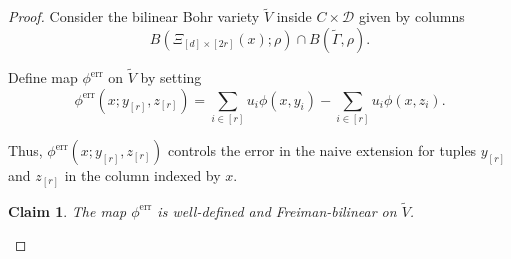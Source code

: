 \documentclass[a4paper,11pt]{article}
\numberwithin{theorem}{section}
\newtheorem{claim}[theorem]{Claim}
\theoremstyle{definition}
\begin{document}
\begin{proof}
    \vspace{\baselineskip}
    
    \indent Consider the bilinear Bohr variety $\tilde{V}$ inside $C \times \mathcal{D}$ given by columns
    \[B(\Xi_{[d] \times [2r]}(x); \rho) \cap B(\tilde{\Gamma}, \rho).\]
    
    Define map $\phi^{\text{err}}$ on $\tilde{V}$ by setting
    \begin{equation}\phi^{\text{err}}(x; y_{[r]}, z_{[r]}) = \sum_{i\in [r]} u_i \phi(x, y_i) - \sum_{i\in [r]} u_i \phi(x, z_i).\label{errorfunctiondefinition}\end{equation}
    
    Thus, $\phi^{\text{err}}(x; y_{[r]}, z_{[r]})$ controls the error in the naive extension for tuples $y_{[r]}$ and $z_{[r]}$ in the column indexed by $x$.
    
    \vspace{\baselineskip}
    
    \begin{claim}
        The map $\phi^{\text{err}}$ is well-defined and Freiman-bilinear on $\tilde{V}$.
    \end{claim}
    

\end{proof}
\end{document}
